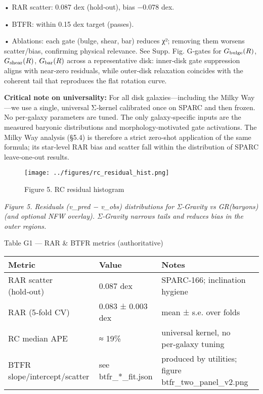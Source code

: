 \documentclass[11pt,a4paper]{article}
\begin{document}
• RAR scatter: 0.087 dex (hold‑out), bias −0.078 dex.  

• BTFR: within 0.15 dex target (passes).  

• Ablations: each gate (bulge, shear, bar) reduces χ²; removing them worsens scatter/bias, confirming physical relevance. See Supp. Fig. G‑gates for $G_{\rm bulge}(R)$, $G_{\rm shear}(R)$, $G_{\rm bar}(R)$ across a representative disk: inner‑disk gate suppression aligns with near‑zero residuals, while outer‑disk relaxation coincides with the coherent tail that reproduces the flat rotation curve.


\textbf{Critical note on universality:} For all disk galaxies—including the Milky Way—we use a single, universal Σ‑kernel calibrated once on SPARC and then frozen. No per‑galaxy parameters are tuned. The only galaxy‑specific inputs are the measured baryonic distributions and morphology‑motivated gate activations. The Milky Way analysis (§5.4) is therefore a strict zero‑shot application of the same formula; its star‑level RAR bias and scatter fall within the distribution of SPARC leave‑one‑out results.


\begin{figure}[h]
\centering
\texttt{[image: ../figures/rc\_residual\_hist.png]}
\caption{Figure 5. RC residual histogram}
\end{figure}


\textit{Figure 5. Residuals (v\_pred − v\_obs) distributions for Σ‑Gravity vs GR(baryons) (and optional NFW overlay). Σ‑Gravity narrows tails and reduces bias in the outer regions.}


Table G1 — RAR \& BTFR metrics (authoritative)


\begin{table}[h]
\centering
\begin{tabular}{lll}
\toprule
Metric & Value & Notes \\
\midrule
RAR scatter (hold‑out) & 0.087 dex & SPARC‑166; inclination hygiene \\
RAR (5‑fold CV) & 0.083 ± 0.003 dex & mean ± s.e. over folds \\
RC median APE & ≈ 19\% & universal kernel, no per‑galaxy tuning \\
BTFR slope/intercept/scatter & see btfr\_*\_fit.json & produced by utilities; figure btfr\_two\_panel\_v2.png \\
\bottomrule
\end{tabular}
\end{table}
\end{document}
